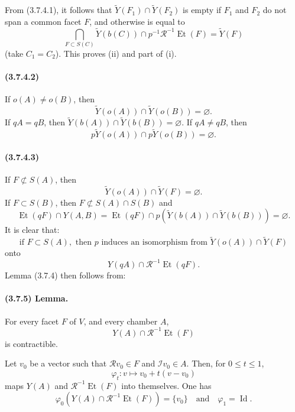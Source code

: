 \documentclass[10pt]{article}
\begin{document}
From (3.7.4.1), it follows that \(\widetilde Y(F_1)\cap\widetilde Y(F_2)\) is empty if \(F_1\) and \(F_2\) do not span a common facet \(F\), and otherwise is equal to
\[
\bigcap_{F\subset S(C)}
\widetilde Y(b(C))\cap p^{-1}\mathcal R^{-1}\operatorname{Et}(F)
=\widetilde Y(F)
\]
(take \(C_1=C_2\)). This proves (ii) and part of (i).

\paragraph{(3.7.4.2)} If \(o(A)\ne o(B)\), then
\[
\widetilde Y(o(A))\cap\widetilde Y(o(B))=\varnothing.
\]
If \(qA=qB\), then \(\widetilde Y(b(A))\cap \widetilde Y(b(B))=\varnothing\). If \(qA\ne qB\), then
\[
p\widetilde Y(o(A))\cap p\widetilde Y(o(B))=\varnothing.
\]

\paragraph{(3.7.4.3)} If \(F\not\subset S(A)\), then
\[
\widetilde Y(o(A))\cap\widetilde Y(F)=\varnothing.
\]
If \(F\subset S(B)\), then \(F\not\subset S(A)\cap S(B)\) and
\[
\operatorname{Et}(qF)\cap Y(A,B)
=\operatorname{Et}(qF)\cap p(\widetilde Y(b(A))\cap\widetilde Y(b(B)))=\varnothing.
\]
It is clear that:
\[
\tag{3.7.4.4}
\text{if }F\subset S(A),\text{ then }p\text{ induces an isomorphism from }
\widetilde Y(o(A))\cap\widetilde Y(F)
\]
onto
\[
Y(qA)\cap\mathcal R^{-1}\operatorname{Et}(qF).
\]
Lemma (3.7.4) then follows from:

\paragraph{(3.7.5) Lemma.} For every facet \(F\) of \(V\), and every chamber \(A\),
\[
Y(A)\cap\mathcal R^{-1}\operatorname{Et}(F)
\]
is contractible.

Let \(v_0\) be a vector such that \(\mathcal Rv_0\in F\) and \(\mathcal Iv_0\in A\). Then, for \(0\le t\le1\),
\[
\varphi_t:v\longmapsto v_0+t(v-v_0)
\]
maps \(Y(A)\) and \(\mathcal R^{-1}\operatorname{Et}(F)\) into themselves. One has
\[
\varphi_0(Y(A)\cap\mathcal R^{-1}\operatorname{Et}(F))=\{v_0\}
\quad\text{and}\quad
\varphi_1=\operatorname{Id}.
\]
\end{document}
